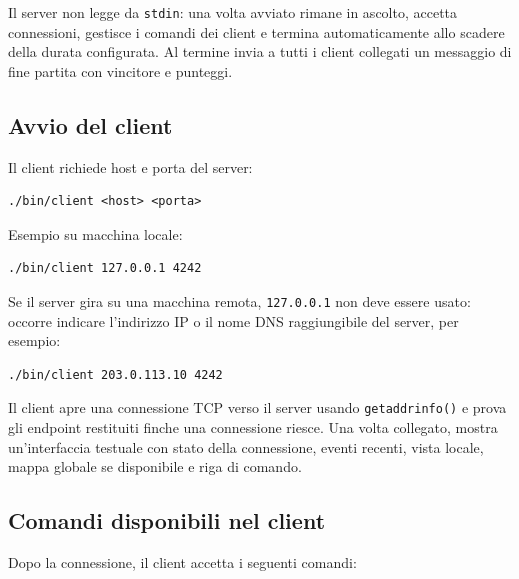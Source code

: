 \documentclass[11pt,a4paper]{article}
\begin{document}
Il server non legge da \texttt{stdin}: una volta avviato rimane in ascolto, accetta connessioni, gestisce i comandi dei client e termina automaticamente allo scadere della durata configurata. Al termine invia a tutti i client collegati un messaggio di fine partita con vincitore e punteggi.

\subsection{Avvio del client}

Il client richiede host e porta del server:

\begin{lstlisting}[style=textstyle]
./bin/client <host> <porta>
\end{lstlisting}

Esempio su macchina locale:

\begin{lstlisting}[style=textstyle]
./bin/client 127.0.0.1 4242
\end{lstlisting}

Se il server gira su una macchina remota, \texttt{127.0.0.1} non deve essere usato: occorre indicare l'indirizzo IP o il nome DNS raggiungibile del server, per esempio:

\begin{lstlisting}[style=textstyle]
./bin/client 203.0.113.10 4242
\end{lstlisting}

Il client apre una connessione TCP verso il server usando \texttt{getaddrinfo()} e prova gli endpoint restituiti finche una connessione riesce. Una volta collegato, mostra un'interfaccia testuale con stato della connessione, eventi recenti, vista locale, mappa globale se disponibile e riga di comando.
\newpage
\subsection{Comandi disponibili nel client}

Dopo la connessione, il client accetta i seguenti comandi:
\end{document}
